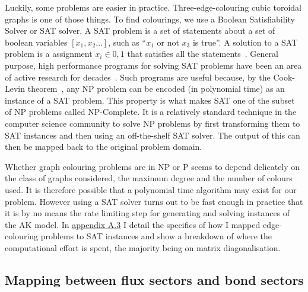 Luckily, some problems are easier in practice. Three-edge-colouring cubic toroidal graphs is one of those things. To find colourings, we use a Boolean Satisfiability Solver or SAT solver. A SAT problem is a set of statements about a set of boolean variables \([x_1, x_2\ldots]\), such as ``\(x_1\) or not \(x_3\) is true''. A solution to a SAT problem is a assignment \(x_i \in {0,1}\) that satisfies all the statements~\autocite{Karp1972}. General purpose, high performance programs for solving SAT problems have been an area of active research for decades~\autocite{alounehComprehensiveStudyAnalysis2019}. Such programs are useful because, by the Cook-Levin theorem~\autocite{cookComplexityTheoremprovingProcedures1971,levin1973universal}, any NP problem can be encoded (in polynomial time) as an instance of a SAT problem. This property is what makes SAT one of the subset of NP problems called NP-Complete. It is a relatively standard technique in the computer science community to solve NP problems by first transforming them to SAT instances and then using an off-the-shelf SAT solver. The output of this can then be mapped back to the original problem domain.

Whether graph colouring problems are in NP or P seems to depend delicately on the class of graphs considered, the maximum degree and the number of colours used. It is therefore possible that a polynomial time algorithm may exist for our problem. However using a SAT solver turns out to be fast enough in practice that it is by no means the rate limiting step for generating and solving instances of the AK model. In \protect\hyperlink{app-lattice-generation}{appendix A.3} I detail the specifics of how I mapped edge-colouring problems to SAT instances and show a breakdown of where the computational effort is spent, the majority being on matrix diagonalisation.

\hypertarget{mapping-between-flux-sectors-and-bond-sectors}{%
\subsection{Mapping between flux sectors and bond sectors}\label{mapping-between-flux-sectors-and-bond-sectors}}


